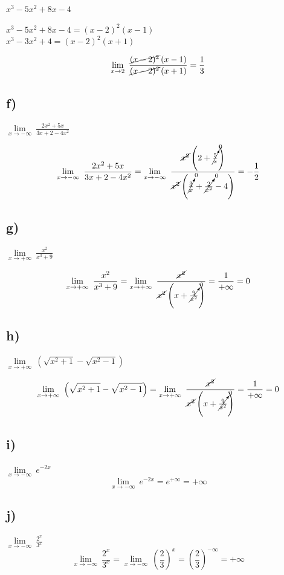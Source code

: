 \documentclass[a4paper]{article}
\begin{document}

\textbf{$x^3-5x^2+8x-4$}
\\




\textbf{$x^3-5x^2+8x-4=(x-2)^2\left(x-1\right)$}\\


\textbf{$x^3-3x^2+4=(x-2)^2\left(x+1\right)$}\\






\[\lim\limits_{x \to 2}\ \frac{\cancel{(x-2)^2}\left(x-1\right)}{\cancel{(x-2)^2}\left(x+1\right)}=\frac{1}{3}\]

\subsection*{f)}\textbf{$\lim\limits_{x \to -\infty}\ \frac{2x^2+5x}{3x+2-4x^2}$}

\[\lim\limits_{x \to -\infty}\ \frac{2x^2+5x}{3x+2-4x^2}=\lim\limits_{x \to -\infty}\ \frac{\cancel{x^2}\left(2+\cancelto{0}{\frac{5}{x}}\right)}{\cancel{x^2}\left(\cancelto{0}{\frac{3}{x}}+\cancelto{0}{\frac{2}{x^2}}-4\right)}=-\frac{1}{2}\]

\subsection*{g)}\textbf{$\lim\limits_{x \to +\infty}\ \frac{x^2}{x^3+9}$}

\[\lim\limits_{x \to +\infty}\ \frac{x^2}{x^3+9}=\lim\limits_{x \to +\infty}\ \frac{\cancel{x^2}}{\cancel{x^2}\left(x+\cancelto{0}{\frac{9}{x^2}}\right)}=\frac{1}{+\infty}=0\]

\subsection*{h)}\textbf{$\lim\limits_{x \to +\infty}\ \left(\sqrt{x^2+1}-\sqrt{x^2-1}\right)$}

\[\lim\limits_{x \to +\infty}\ \left(\sqrt{x^2+1}-\sqrt{x^2-1}\right)=\lim\limits_{x \to +\infty}\ \frac{\cancel{x^2}}{\cancel{x^2}\left(x+\cancelto{0}{\frac{9}{x^2}}\right)}=\frac{1}{+\infty}=0\]

\subsection*{i)}\textbf{$\lim\limits_{x \to -\infty}\ e^{-2x}$}
\[\lim\limits_{x \to -\infty}\ e^{-2x}=e^{+\infty}=+\infty\]

\subsection*{j)}\textbf{$\lim\limits_{x \to -\infty}\ \frac{2^x}{3^x}$}
\[\lim\limits_{x \to -\infty}\ \frac{2^x}{3^x}=\lim\limits_{x \to -\infty}\ \left(\frac{2}{3}\right)^x=\left(\frac{2}{3}\right)^{-\infty}=+\infty\]
\end{document}
